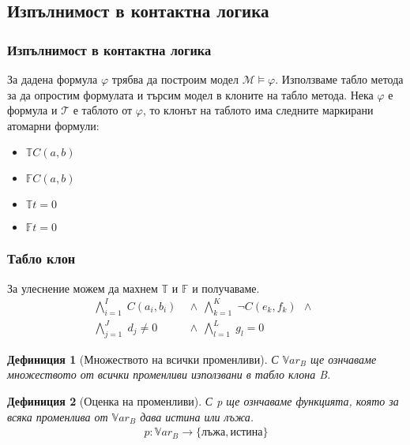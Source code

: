 \documentclass{beamer}
\newtheorem{defn}{Дефиниция}[section]
\newcommand{\Var}{\mathbb{V}ar}
\newcommand{\signT}{\mathbb{T}}
\newcommand{\signF}{\mathbb{F}}
\begin{document}
\subsection{Изпълнимост в контактна логика}
\begin{frame}\frametitle{Изпълнимост в контактна логика}
За дадена формула $\varphi$ трябва да построим модел $\mathcal{M} \models \varphi$.
\newline
\newline
Използваме табло метода за да опростим формулата и търсим модел в клоните на табло метода.
\newline
\newline
		Нека $\varphi$ е формула и $\mathcal{T}$ е таблото от $\varphi$, то клонът на таблото има следните маркирани атомарни формули:
\begin{itemize}
	\item $\signT C(a, b)$
	\item $\signF C(a, b)$ 
	\item $\signT t = 0$
	\item $\signF t = 0$
\end{itemize}
\end{frame}

\begin{frame}\frametitle{Табло клон}
		За улеснение можем да махнем $\signT \textit{ и } \signF$ и получаваме.
\begin{align*}
			\bigwedge_{i=1}^{I} \; C(a_i, b_i) \:\: & \wedge \:\: 
			\bigwedge_{k=1}^{K} \; \neg C(e_k, f_k) \:\: \wedge \:\: \\
			\bigwedge_{j=1}^{J} \; d_j \neq 0 \:\: & \wedge \:\:
			\bigwedge_{l=1}^{L} \; g_l = 0 \:\:
\end{align*}%
\end{frame}

\begin{frame}
\begin{defn}[Множеството на всички променливи]
	С $\Var_B$ ще ознчаваме множеството от всички променливи използвани в табло клона B.
\end{defn}

\begin{defn}[Оценка на променливи]
	С p ще ознчаваме функцията, която за всяка променлива от $\Var_B$ дава истина или лъжа.
		\begin{align*}
			p : \Var_B \rightarrow \{ \textbf{лъжа}, \textbf{истина}\}
		\end{align*}
\end{defn}
\end{frame}
\end{document}
